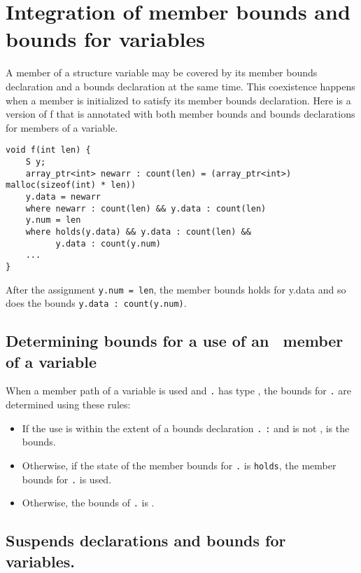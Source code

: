 \section{Integration of member bounds and bounds for variables}

A member of a structure variable may be covered by its member bounds
declaration and a bounds declaration at the same time. This coexistence
happens when a member is initialized to satisfy its member bounds
declaration. Here is a version of f that is annotated with both member
bounds and bounds declarations for members of a variable.
\begin{verbatim}
void f(int len) {
    S y;
    array_ptr<int> newarr : count(len) = (array_ptr<int>) malloc(sizeof(int) * len))
    y.data = newarr
    where newarr : count(len) && y.data : count(len)
    y.num = len
    where holds(y.data) && y.data : count(len) && 
          y.data : count(y.num)
    ...
}
\end{verbatim}

After the assignment \texttt{y.num = len}, the member bounds holds for
y.data and so does the bounds \texttt{y.data : count(y.num)}.

\subsection{Determining bounds for a use of an \arrayptr\ member of a variable}
\label{section:determining-variable-member-bounds}

When a member path  of a variable  is used and
\texttt{.} has type \arrayptr, the bounds for
\texttt{.} are determined using these rules:

\begin{itemize}
\item
  If the use is within the extent of a bounds declaration
  \texttt{.} \texttt{:}  and
   is not \boundsnone,  is
  the bounds.
\item
  Otherwise, if the state of the member bounds for
  \texttt{.} is \texttt{holds}, the member bounds for
  \texttt{.} is used.
\item
  Otherwise, the bounds of \texttt{.} is
  \boundsnone.
\end{itemize}

\subsection{Suspends declarations and bounds for variables.}

